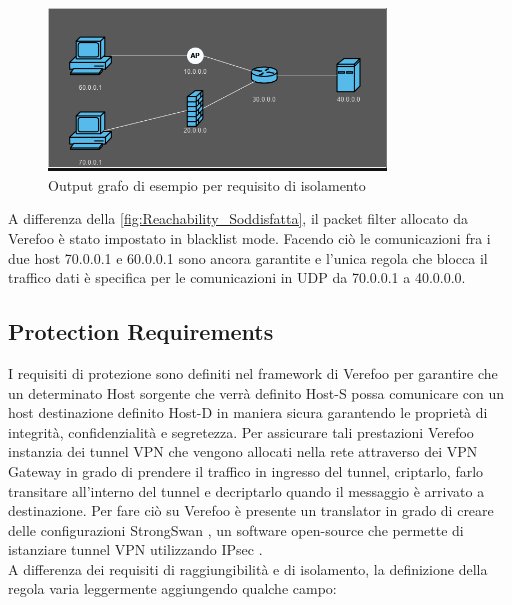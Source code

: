 \begin{figure}[h]  %
    \centering
    \includegraphics[width=0.8\textwidth]{Isolation_Soddisfatta.png}  %
    \caption{Output grafo di esempio per requisito di isolamento}
    \label{fig:Isolation_Soddisfatta}
  \end{figure}

  A differenza della \ref{fig:Reachability_Soddisfatta}, il packet filter allocato da Verefoo è stato impostato in blacklist
  mode. Facendo ciò le comunicazioni fra i due host 70.0.0.1 e 60.0.0.1 sono ancora garantite e l'unica regola che blocca il traffico
  dati è specifica per le comunicazioni in UDP da 70.0.0.1 a 40.0.0.0.
  \newpage


  \subsection{Protection Requirements}
  I requisiti di protezione sono definiti nel framework di Verefoo per garantire che un determinato Host sorgente che verrà definito Host-S possa 
  comunicare con un host destinazione definito Host-D in maniera sicura garantendo le proprietà di integrità, confidenzialità e segretezza.
  Per assicurare tali prestazioni Verefoo instanzia dei tunnel VPN che vengono allocati nella rete attraverso dei  VPN Gateway in grado di prendere il traffico in ingresso
  del tunnel, criptarlo, farlo transitare all'interno del tunnel e decriptarlo quando il messaggio è arrivato a destinazione. Per fare ciò su Verefoo è presente un translator
  in grado di creare delle configurazioni StrongSwan \cite{strongswan}, un software open-source che permette di istanziare tunnel VPN utilizzando IPsec \cite{ipsec}.\\

  A differenza dei requisiti di raggiungibilità e di isolamento, la definizione della regola varia leggermente aggiungendo qualche campo:

